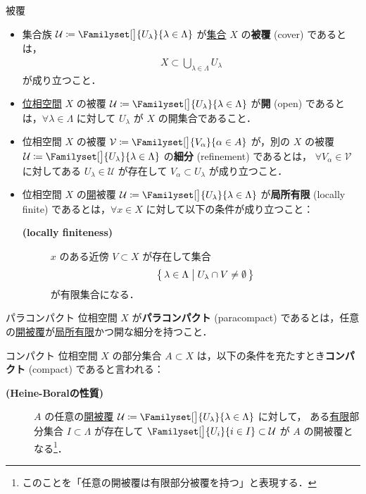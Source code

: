 \documentclass[algtopo_main]{subfiles}
\begin{document}
\begin{mydef}[label=def:cover, breakable]{被覆}
    \begin{itemize}
        \item 集合族 $\mathcal{U} \coloneqq \Familyset[\big]{U_\lambda}{\lambda \in \Lambda}$ が\underline{集合} $X$ の\textbf{被覆} (cover) であるとは，
        \begin{align}
            X \subset \bigcup_{\lambda \in \Lambda} U_\lambda
        \end{align}
        が成り立つこと．
        \item \underline{位相空間} $X$ の被覆 $\mathcal{U} \coloneqq \Familyset[\big]{U_\lambda}{\lambda \in \Lambda}$ が\textbf{開} (open) であるとは，$\forall \lambda \in \Lambda$ に対して $U_\lambda$ が $X$ の開集合であること．
        \item 位相空間 $X$ の被覆 $\mathcal{V} \coloneqq \Familyset[\big]{V_\alpha}{\alpha \in A}$ が，別の $X$ の被覆 $\mathcal{U} \coloneqq \Familyset[\big]{U_\lambda}{\lambda \in \Lambda}$ の\textbf{細分} (refinement) であるとは，
        $\forall V_\alpha \in \mathcal{V}$ に対してある $U_\lambda \in \mathcal{U}$ が存在して $V_\alpha \subset U_\lambda$ が成り立つこと．
        \item 位相空間 $X$ の\underline{開}被覆 $\mathcal{U} \coloneqq \Familyset[\big]{U_\lambda}{\lambda \in \Lambda}$ が\textbf{局所有限} (locally finite) であるとは，$\forall x \in X$ に対して以下の条件が成り立つこと：
        \begin{description}
            \item[\textbf{(locally finiteness)}] $x$ のある近傍 $V \subset X$ が存在して集合
            \begin{align}
                \bigl\{\, \lambda \in \Lambda \bigm| U_\lambda \cap V \neq \emptyset \,\bigr\} 
            \end{align}
            が有限集合になる．
        \end{description}
    \end{itemize}
\end{mydef}

\begin{mydef}[label=def:paracompact]{パラコンパクト}
    位相空間 $X$ が\textbf{パラコンパクト} (paracompact) であるとは，任意の\hyperref[def:cover]{開被覆}が\hyperref[def:cover]{局所有限}かつ開な細分を持つこと．
\end{mydef}

\begin{mydef}[label=def:compact]{コンパクト}
    位相空間 $X$ の部分集合 $A \subset X$ は，以下の条件を充たすとき\textbf{コンパクト} (compact) であると言われる：
    \begin{description}
        \item[\textbf{(Heine-Boralの性質)}] $A$ の任意の\hyperref[def:cover]{開被覆} $\mathcal{U} \coloneqq \Familyset[\big]{U_\lambda}{\lambda \in \Lambda}$ に対して，
        ある\underline{有限}部分集合 $I \subset \Lambda$ が存在して $\Familyset[\big]{U_i}{i \in I} \subset \mathcal{U}$ が $A$ の開被覆となる\footnote{このことを「任意の開被覆は有限部分被覆を持つ」と表現する．}．
    \end{description}
\end{mydef}
\end{document}
